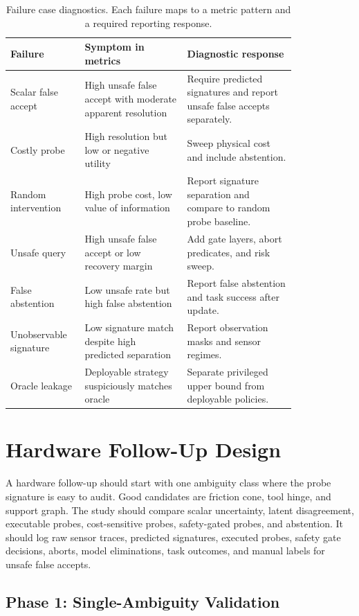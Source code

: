 \documentclass{article}
\begin{document}
\begin{table}[p]
\centering
\small
\begin{tabular}{p{0.18\linewidth}p{0.31\linewidth}p{0.33\linewidth}}
\toprule
Failure & Symptom in metrics & Diagnostic response \\
\midrule
Scalar false accept & High unsafe false accept with moderate apparent resolution & Require predicted signatures and report unsafe false accepts separately. \\
Costly probe & High resolution but low or negative utility & Sweep physical cost and include abstention. \\
Random intervention & High probe cost, low value of information & Report signature separation and compare to random probe baseline. \\
Unsafe query & High unsafe false accept or low recovery margin & Add gate layers, abort predicates, and risk sweep. \\
False abstention & Low unsafe rate but high false abstention & Report false abstention and task success after update. \\
Unobservable signature & Low signature match despite high predicted separation & Report observation masks and sensor regimes. \\
Oracle leakage & Deployable strategy suspiciously matches oracle & Separate privileged upper bound from deployable policies. \\
\bottomrule
\end{tabular}
\caption{Failure case diagnostics. Each failure maps to a metric pattern and a required reporting response.}
\label{tab:failure_diagnostics}
\end{table}

\section{Hardware Follow-Up Design}

A hardware follow-up should start with one ambiguity class where the probe signature is easy to audit. Good candidates are friction cone, tool hinge, and support graph. The study should compare scalar uncertainty, latent disagreement, executable probes, cost-sensitive probes, safety-gated probes, and abstention. It should log raw sensor traces, predicted signatures, executed probes, safety gate decisions, aborts, model eliminations, task outcomes, and manual labels for unsafe false accepts.

\subsection{Phase 1: Single-Ambiguity Validation}
\end{document}
